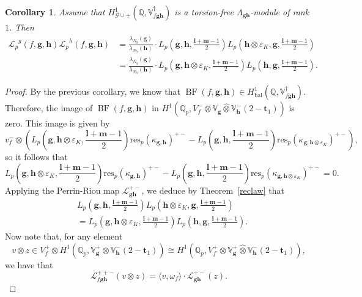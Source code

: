\documentclass[a4paper,11pt]{amsart}
\theoremstyle{plain}
\newtheorem{corollary}[theorem]{Corollary}
\theoremstyle{definition}
\theoremstyle{remark}
\newcommand{\bb}{\mathbb}
\newcommand{\cl}{\mathcal}
\DeclareMathOperator{\BF}{BF}
\DeclareMathOperator{\bal}{bal}
\newcommand{\Lp}{{\mathscr{L}_p}}
\newcommand{\hg}{{\mathbf{g}}}
\newcommand{\hh}{{\mathbf h}}
\newcommand{\res}{\mathrm{res}}
\numberwithin{equation}{section}
\begin{document}
\begin{corollary}
    Assume that $H^1_{\cl{G}\cup +}(\bb{Q}, \bb{V}_{f\hg\hh}^\dagger)$ is a torsion-free $\Lambda_{\hg\hh}$-module of rank $1$. Then
    \begin{align*}
     \Lp^g(f,\hg,\hh)\Lp^h(f,\hg,\hh)&=\frac{\lambda_{N_g}(\hg)}{\lambda_{N_h}(\hh)}\cdot L_p\left(\hg,\hh,\frac{\mathbf{l}+\mathbf{m}-1}{2}\right)L_p\left(\hh\otimes\varepsilon_K,\hg,\frac{\mathbf{l}+\mathbf{m}-1}{2}\right) \\ &=\frac{\lambda_{N_g}(\hg)}{\lambda_{N_h}(\hh)}\cdot L_p\left(\hg,\hh\otimes\varepsilon_K,\frac{\mathbf{l}+\mathbf{m}-1}{2}\right)L_p\left(\hh,\hg,\frac{\mathbf{l}+\mathbf{m}-1}{2}\right).
    \end{align*}
\end{corollary}
\begin{proof}
    By the previous corollary, we know that $\BF(f,\hg,\hh)\in H^1_{\bal}(\bb{Q},\bb{V}_{f\hg\hh}^\dagger)$. Therefore, the image of $\BF(f,\hg,\hh)$ in $H^1(\bb{Q}_p,V_f^-\otimes\bb{V}_{\hg}\hat{\otimes}\bb{V}_{\hh}^{-}(2-\mathbf{t}_1))$ is zero. This image is given by
    \[
    v_f^-\otimes \left(L_p\left(\hg,\hh\otimes\varepsilon_K,\frac{\mathbf{l}+\mathbf{m}-1}{2}\right)\res_p(\kappa_{\hg,\hh})^{+-}-L_p\left(\hg,\hh,\frac{\mathbf{l}+\mathbf{m}-1}{2}\right)\res_p(\kappa_{\hg,\hh\otimes\varepsilon_K})^{+-}\right),
    \]
    so it follows that
    \[
    L_p\left(\hg,\hh\otimes\varepsilon_K,\frac{\mathbf{l}+\mathbf{m}-1}{2}\right)\res_p(\kappa_{\hg,\hh})^{+-}-L_p\left(\hg,\hh,\frac{\mathbf{l}+\mathbf{m}-1}{2}\right)\res_p(\kappa_{\hg,\hh\otimes\varepsilon_K})^{+-}=0.
    \]
    Applying the Perrin-Riou map $\mathcal{L}_{\hg\hh}^{+-}$, we deduce by Theorem~\ref{reclaw} that
    \begin{align}
    &L_p\left(\hg,\hh,\frac{\mathbf{l}+\mathbf{m}-1}{2}\right)L_p\left(\hh\otimes\varepsilon_K,\hg,\frac{\mathbf{l}+\mathbf{m}-1}{2}\right) \nonumber \\
    &=L_p\left(\hg,\hh\otimes\varepsilon_K,\frac{\mathbf{l}+\mathbf{m}-1}{2}\right)L_p\left(\hh,\hg,\frac{\mathbf{l}+\mathbf{m}-1}{2}\right). \label{eq:equalityofHRpadicLfunctions}
    \end{align}
    Now note that, for any element
    \[
    v\otimes z \in V_f^+ \otimes H^1(\bb{Q}_p,\bb{V}_\hg^+\hat{\otimes} \bb{V}_\hh^-(2-\mathbf{t}_1))\cong H^1(\bb{Q}_p,V_f^+\otimes \bb{V}_{\hg}^+\hat{\otimes}\bb{V}_{\hh}^-(2-\mathbf{t}_1)),
    \]
    we have that
    \[
    \mathcal{L}_{f\hg\hh}^{++-}(v\otimes z)=\langle v,\omega_f\rangle \cdot\mathcal{L}_{\hg\hh}^{+-}(z).
\]
\end{proof}
\end{document}
